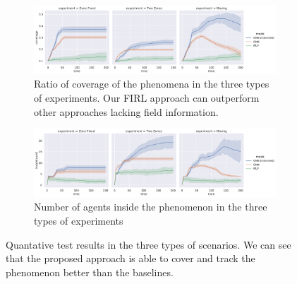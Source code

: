 \documentclass[conference]{IEEEtran}
\begin{document}

\begin{figure}
  \centering
  \begin{subfigure}[b]{0.9\linewidth}
    \includegraphics[width=\linewidth]{imgs/coverage-test.pdf}
    \caption{Ratio of coverage of the phenomena in the three types of experiments. Our \ac{FIRL} approach can outperform other approaches lacking field information.}
    \label{fig:coverage-test}
  \end{subfigure}
  \begin{subfigure}[b]{0.9\linewidth}
    \includegraphics[width=\linewidth]{imgs/inside-test}
    \caption{Number of agents inside the phenomenon in the three types of experiments}
    \label{fig:inside-test}
  \end{subfigure}
	\caption{Quantative test results in the three types of scenarios.
	 	We can see that the proposed approach is able to cover and track the phenomenon better than the baselines.
	}
	\label{fig:test}
\end{figure}
\end{document}
